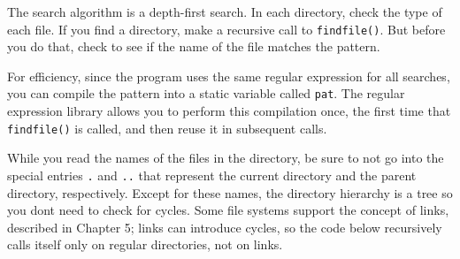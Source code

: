 
The search algorithm is a depth-first search. In each directory, check
the type of each file. If you find a directory, make a recursive call
to \texttt{findfile()}. But before you do that, check to see if the
name of the file matches the pattern. 

For efficiency, since the program uses the same regular expression for
all searches, you can compile the pattern into a static variable called
\texttt{pat}. The regular expression library allows you to perform this
compilation once, the first time that \texttt{findfile()} is called,
and then reuse it in subsequent calls.


While you read the names of the files in the directory, be sure to not
go into the special entries \texttt{{\textquotedbl}.{\textquotedbl}}
and \texttt{{\textquotedbl}..{\textquotedbl}} that represent the
current directory and the parent directory, respectively. Except for
these names, the directory hierarchy is a tree so you
don{\textquotesingle}t need to check for cycles. Some file systems
support the concept of links, described in
Chapter 5; links can introduce cycles, so the code below
recursively calls itself only on regular
directories, not on links.


